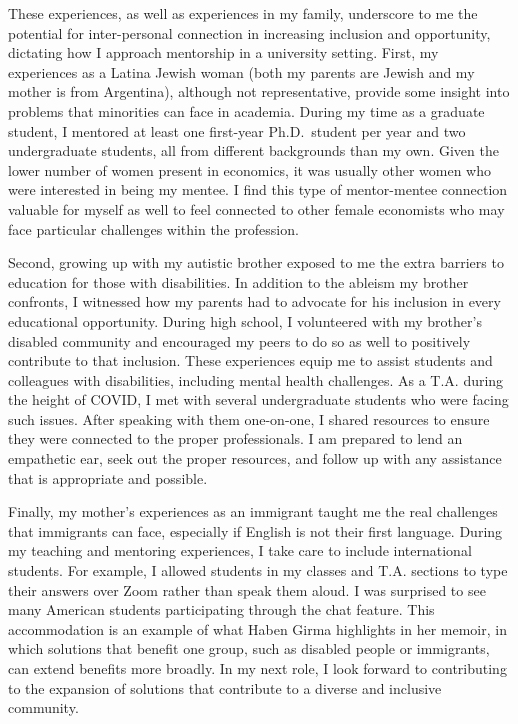 These experiences, as well as experiences in my family, underscore to me the potential for inter-personal connection in increasing inclusion and opportunity, dictating how I approach mentorship in a university setting. First, my experiences as a Latina Jewish woman (both my parents are Jewish and my mother is from Argentina), although not representative, provide some insight into problems that minorities can face in academia. During my time as a graduate student, I mentored at least one first-year Ph.D.\ student per year and two undergraduate students, all from different backgrounds than my own. Given the lower number of women present in economics, it was usually other women who were interested in being my mentee. I find this type of mentor-mentee connection valuable for myself as well to feel connected to other female economists who may face particular challenges within the profession. 

Second, growing up with my autistic brother exposed to me the extra barriers to education for those with disabilities. In addition to the ableism my brother confronts, I witnessed how my parents had to advocate for his inclusion in every educational opportunity. During high school, I volunteered with my brother's disabled community and encouraged my peers to do so as well to positively contribute to that inclusion. These experiences equip me to assist students and colleagues with disabilities, including mental health challenges. As a T.A. during the height of COVID, I met with several undergraduate students who were facing such issues. After speaking with them one-on-one, I shared resources to ensure they were connected to the proper professionals. I am prepared to lend an empathetic ear, seek out the proper resources, and follow up with any assistance that is appropriate and possible. 

Finally, my mother's experiences as an immigrant taught me the real challenges that immigrants can face, especially if English is not their first language.  During my teaching and mentoring experiences, I take care to include international students. For example, I allowed students in my classes and T.A. sections to type their answers over Zoom rather than speak them aloud. I was surprised to see many American students participating through the chat feature. This accommodation is an example of what Haben Girma highlights in her memoir, in which solutions that benefit one group, such as disabled people or immigrants, can extend benefits more broadly. In my next role, I look forward to contributing to the expansion of solutions that contribute to a diverse and inclusive community. 


\singlespacing





